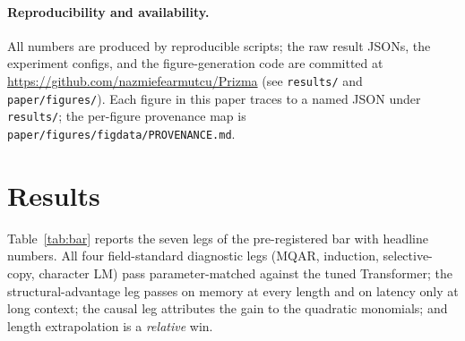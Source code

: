 \documentclass[11pt]{article}
\begin{document}
\paragraph{Reproducibility and availability.}
All numbers are produced by reproducible scripts; the raw result JSONs, the experiment configs, and
the figure-generation code are committed at \url{https://github.com/nazmiefearmutcu/Prizma} (see
\texttt{results/} and \texttt{paper/figures/}). Each figure in this paper traces to a named JSON
under \texttt{results/}; the per-figure provenance map is
\texttt{paper/\allowbreak figures/\allowbreak figdata/\allowbreak PROVENANCE.md}.

\section{Results}
\label{sec:results}

Table~\ref{tab:bar} reports the seven legs of the pre-registered bar with headline numbers. All four
field-standard diagnostic legs (MQAR, induction, selective-copy, character LM) pass parameter-matched
against the tuned Transformer; the structural-advantage leg passes on memory at every length and on
latency only at long context; the causal leg attributes the gain to the quadratic monomials; and
length extrapolation is a \emph{relative} win.
\end{document}
